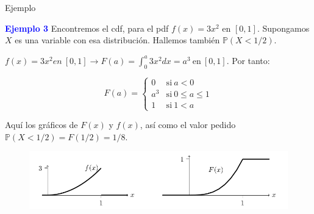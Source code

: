 \documentclass[10pt]{beamer}
\begin{document}
\begin{frame}{Ejemplo}
\small{\textcolor{blue}{\textbf {Ejemplo 3}} Encontremos el cdf, para el pdf $f(x) = 3x^2$ en $[0,1]$. Supongamos $X$ es una variable con esa distribuci\'on. Hallemos tambi\'en  $\mathbb{P}(X < 1/2)$.

\vspace{0.2cm}

$f(x) = 3x^2 en \  [0,1] \rightarrow F(a) = \int_{0}^{a}3x^2 dx = a^3\ \text{en}\ [0,1]$. Por tanto:

\[
F(a) = \begin{cases}
0 & \text{si}\  a <  0 \\
a^3 & \text{si}\  0 \leq a \leq 1 \\
1 & \text{si}\  1 < a
\end{cases}
\]

\vspace{0.2cm}

Aqu\'i los gr\'aficos de $F(x)$ y $f(x)$, as\'i como el valor pedido $\mathbb{P}(X < 1/2) = F(1/2) = 1/8$.


\begin{figure}[ht]
	\centering
	\includegraphics[scale=.35]{G6.png}
\end{figure}


}
\end{frame}
\end{document}
